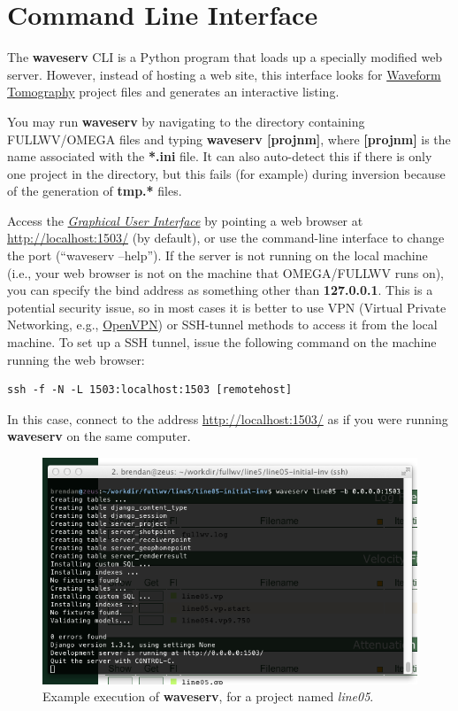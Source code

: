 \documentclass[letterpaper,10pt,english]{sphinxmanual}
\begin{document}
\chapter{Command Line Interface}
\label{cli:command-line-interface}\label{cli::doc}\label{cli:cli}
The \textbf{waveserv} CLI is a Python program that loads up a specially modified web server.  However, instead of hosting a web site, this interface looks for \href{http://orion.es.uwo.ca/index.php/Waveform\_Tomography}{Waveform Tomography} project files and generates an interactive listing.

You may run \textbf{waveserv} by navigating to the directory containing FULLWV/OMEGA files and typing \textbf{waveserv {[}projnm{]}}, where \textbf{{[}projnm{]}} is the name associated with the \textbf{*.ini} file.  It can also auto-detect this if there is only one project in the directory, but this fails (for example) during inversion because of the generation of \textbf{tmp.*} files.

Access the {\hyperref[gui:gui]{\emph{Graphical User Interface}}} by pointing a web browser at \href{http://localhost:1503/}{http://localhost:1503/} (by default), or use the command-line interface to change the port (``waveserv --help'').  If the server is not running on the local machine (i.e., your web browser is not on the machine that OMEGA/FULLWV runs on), you can specify the bind address as something other than \textbf{127.0.0.1}.  This is a potential security issue, so in most cases it is better to use VPN (Virtual Private Networking, e.g., \href{http://openvpn.net/}{OpenVPN}) or SSH-tunnel methods to access it from the local machine.  To set up a SSH tunnel, issue the following command on the machine running the web browser:

\begin{Verbatim}[commandchars=\\\{\}]
ssh -f -N -L 1503:localhost:1503 [remotehost]
\end{Verbatim}

In this case, connect to the address \href{http://localhost:1503/}{http://localhost:1503/} as if you were running \textbf{waveserv} on the same computer.
\begin{figure}[htbp]
\centering
\capstart

\includegraphics{startcmd.png}
\caption{Example execution of \textbf{waveserv}, for a project named \emph{line05}.}\end{figure}
\end{document}
